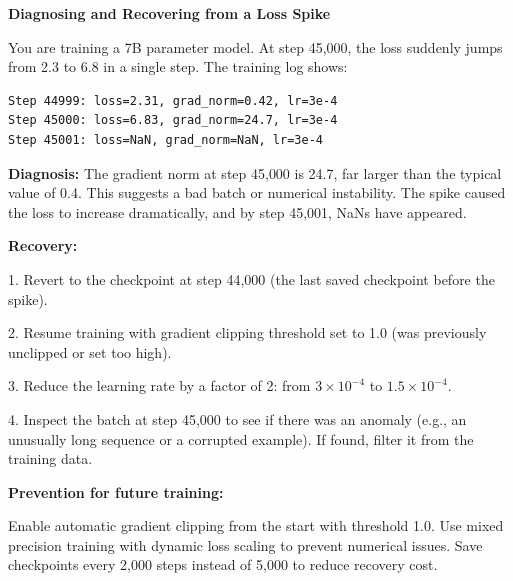 \vspace{1.5em}

\begin{examplebox}
\textbf{Diagnosing and Recovering from a Loss Spike}

\vspace{0.5em}

You are training a 7B parameter model. At step 45,000, the loss suddenly jumps from 2.3 to 6.8 in a single step. The training log shows:

\vspace{0.3em}

\begin{verbatim}
Step 44999: loss=2.31, grad_norm=0.42, lr=3e-4
Step 45000: loss=6.83, grad_norm=24.7, lr=3e-4
Step 45001: loss=NaN, grad_norm=NaN, lr=3e-4
\end{verbatim}

\vspace{0.5em}

\textbf{Diagnosis:} The gradient norm at step 45,000 is 24.7, far larger than the typical value of 0.4. This suggests a bad batch or numerical instability. The spike caused the loss to increase dramatically, and by step 45,001, NaNs have appeared.

\vspace{0.5em}

\textbf{Recovery:}

1. Revert to the checkpoint at step 44,000 (the last saved checkpoint before the spike).

2. Resume training with gradient clipping threshold set to 1.0 (was previously unclipped or set too high).

3. Reduce the learning rate by a factor of 2: from $3 \times 10^{-4}$ to $1.5 \times 10^{-4}$.

4. Inspect the batch at step 45,000 to see if there was an anomaly (e.g., an unusually long sequence or a corrupted example). If found, filter it from the training data.

\vspace{0.5em}

\textbf{Prevention for future training:}

Enable automatic gradient clipping from the start with threshold 1.0. Use mixed precision training with dynamic loss scaling to prevent numerical issues. Save checkpoints every 2,000 steps instead of 5,000 to reduce recovery cost.
\end{examplebox}

\vspace{1.5em}

